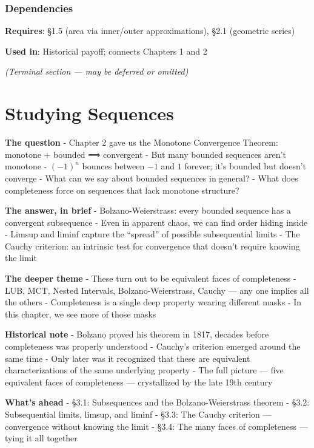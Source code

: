 \documentclass[
  10pt,
  letterpaper,
]{scrbook}
\begin{document}
\subsection{Dependencies}\label{dependencies-10}

\textbf{Requires}: §1.5 (area via inner/outer approximations), §2.1
(geometric series)

\textbf{Used in}: Historical payoff; connects Chapters 1 and 2

\emph{(Terminal section --- may be deferred or omitted)}

\chapter{Studying Sequences}\label{studying-sequences}

\textbf{The question} - Chapter 2 gave us the Monotone Convergence
Theorem: monotone + bounded ⟹ convergent - But many bounded sequences
aren't monotone - \((-1)^n\) bounces between \(-1\) and \(1\) forever;
it's bounded but doesn't converge - What can we say about bounded
sequences in general? - What does completeness force on sequences that
lack monotone structure?

\textbf{The answer, in brief} - Bolzano-Weierstrass: every bounded
sequence has a convergent subsequence - Even in apparent chaos, we can
find order hiding inside - Limsup and liminf capture the ``spread'' of
possible subsequential limits - The Cauchy criterion: an intrinsic test
for convergence that doesn't require knowing the limit

\textbf{The deeper theme} - These turn out to be equivalent faces of
completeness - LUB, MCT, Nested Intervals, Bolzano-Weierstrass, Cauchy
--- any one implies all the others - Completeness is a single deep
property wearing different masks - In this chapter, we see more of those
masks

\textbf{Historical note} - Bolzano proved his theorem in 1817, decades
before completeness was properly understood - Cauchy's criterion emerged
around the same time - Only later was it recognized that these are
equivalent characterizations of the same underlying property - The full
picture --- five equivalent faces of completeness --- crystallized by
the late 19th century

\textbf{What's ahead} - §3.1: Subsequences and the Bolzano-Weierstrass
theorem - §3.2: Subsequential limits, limsup, and liminf - §3.3: The
Cauchy criterion --- convergence without knowing the limit - §3.4: The
many faces of completeness --- tying it all together
\end{document}
